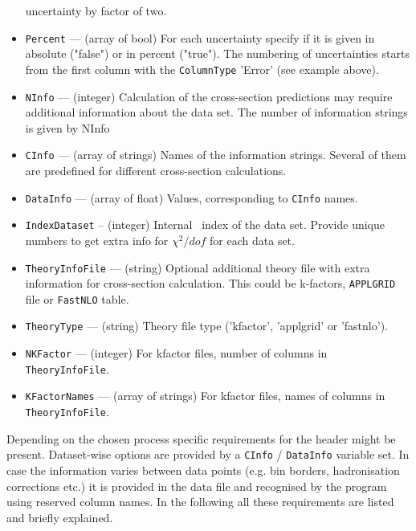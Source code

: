 \begin{itemize}
                      uncertainty by factor of two.                       
      \item {\tt Percent}     --- (array of bool) For each uncertainty specify if it is given in 
                      absolute ("false") or in percent ("true").  The numbering of 
                      uncertainties starts from the first column with the 
                      {\tt ColumnType} 'Error' (see example above).
      \item {\tt NInfo}       --- (integer) Calculation of the cross-section predictions may 
                      require  additional information about the data set. The number of 
                      information strings is given by NInfo
      \item {\tt CInfo}       --- (array of strings) Names of the information strings. 
                      Several of them are predefined for different cross-section 
                      calculations.
      \item {\tt DataInfo}    --- (array of float) Values, corresponding to {\tt CInfo} names.
      \item {\tt IndexDataset} -- (integer) Internal \fitter\ index of the data set. Provide unique
                      numbers to get extra info for $\chi^2/dof$ for each data set.      
      \item {\tt TheoryInfoFile} --- (string) Optional additional theory file with extra 
                     information for cross-section calculation. This could be k-factors,
                     {\tt APPLGRID} file or {\tt FastNLO} table.  
      \item {\tt TheoryType} --- (string) Theory file type ('kfactor', 'applgrid' or 'fastnlo').      
      \item {\tt NKFactor}   --- (integer) For kfactor files, number of columns in
                     {\tt TheoryInfoFile}.
      \item {\tt KFactorNames} --- (array of strings) For kfactor files, names of columns in 
                     {\tt TheoryInfoFile}.
\end{itemize}

Depending on the chosen process specific requirements for the header might be present. 
Dataset-wise options are provided by a {\tt CInfo} / {\tt DataInfo} variable set. In case the information
varies between data points (e.g. bin borders, hadronisation corrections etc.) it is
provided in the data file and recognised by the program using reserved column names.
In the following all these requirements are listed and briefly explained.

